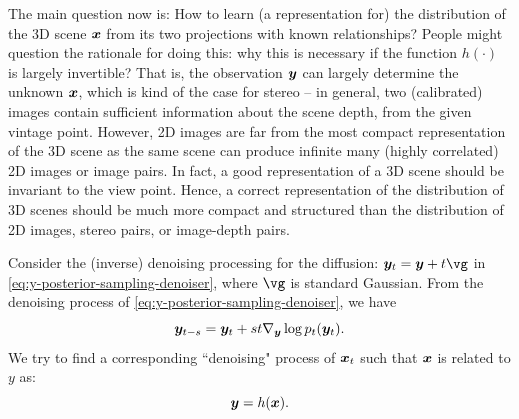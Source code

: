 \documentclass[../../book-main.tex]{subfiles}
\begin{document}
The main question now is: How to learn (a representation for) the distribution of the 3D scene $\bm{x}$ from its two projections with known relationships? 
People might question the rationale for doing this: why this is necessary if the function $h(\cdot)$ is largely invertible? That is, the observation $\bm{y}$ can largely determine the unknown $\bm{x}$, which is kind of the case for stereo -- in general, two (calibrated) images contain sufficient information about the scene depth, from the given vintage point. However, 2D images are far from the most compact representation of the 3D scene as the same scene can produce infinite many (highly correlated) 2D images or image pairs. In fact, a good representation of a 3D scene should be invariant to the view point. Hence, a correct representation of the distribution of 3D scenes should be much more compact and structured than the distribution of 2D images, stereo pairs, or image-depth pairs. 

Consider the (inverse) denoising processing for the diffusion: $\y_t = \y + t\vg $ in \eqref{eq:y-posterior-sampling-denoiser}, where $\vg$ is standard Gaussian. From the denoising process of \eqref{eq:y-posterior-sampling-denoiser}, we have
\begin{equation}
    \bm{y}_{t-s} =  \bm{y}_t + st \nabla_{\bm{y}} \log p_t(\bm{y}_t).
\end{equation}
We try to find a corresponding ``denoising" process of $\bm{x}_t$ such that $\bm{x}$ is related to $y$ as:
\begin{equation}
    \bm{y} =  h(\bm{x}).
\end{equation}
\end{document}
